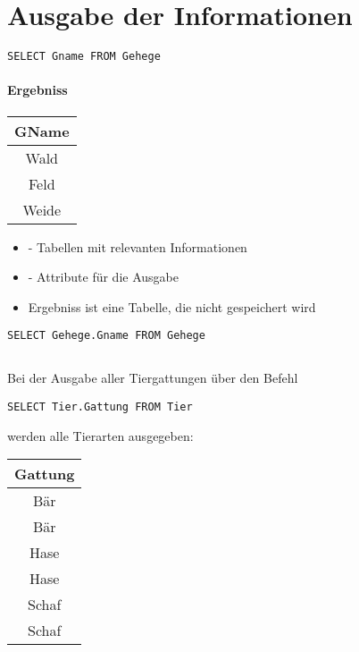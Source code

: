 \section{Ausgabe der Informationen}

    \begin{lstlisting}[style=sqlstyle]
        SELECT Gname FROM Gehege
    \end{lstlisting}

    \paragraph{Ergebniss}

    \begin{table}[H]
        \centering
        \begin{tabular}{|c|}
            \hline
            \textbf{GName} \\
            \hline
            Wald \\
            Feld \\
            Weide \\
            \hline
        \end{tabular}
    \end{table}

    \begin{itemize}
        \item {} - Tabellen mit relevanten Informationen
        \item {} - Attribute für die Ausgabe
        \item Ergebniss ist eine Tabelle, die nicht gespeichert wird
    \end{itemize}

    \begin{lstlisting}[style=sqlstyle]
        SELECT Gehege.Gname FROM Gehege
    \end{lstlisting}

    \subsection{}

    Bei der Ausgabe aller Tiergattungen über den Befehl
    \begin{lstlisting}[style=sqlstyle]
        SELECT Tier.Gattung FROM Tier
    \end{lstlisting}

    werden alle Tierarten ausgegeben:
    \begin{table}[H]
        \centering
        \begin{tabular}{|c|}
            \hline
            \textbf{Gattung} \\
            \hline
            Bär \\
            Bär \\
            Hase \\
            Hase \\
            Schaf \\
            Schaf \\
            \hline
        \end{tabular}
    \end{table}

